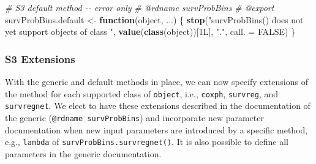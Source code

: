 \documentclass[
]{book}
\newenvironment{Shaded}{\begin{snugshade}}{\end{snugshade}}
\newcommand{\AttributeTok}[1]{\textcolor[rgb]{0.13,0.29,0.53}{#1}}
\newcommand{\CommentTok}[1]{\textcolor[rgb]{0.56,0.35,0.01}{\textit{#1}}}
\newcommand{\ConstantTok}[1]{\textcolor[rgb]{0.56,0.35,0.01}{#1}}
\newcommand{\ControlFlowTok}[1]{\textcolor[rgb]{0.13,0.29,0.53}{\textbf{#1}}}
\newcommand{\FunctionTok}[1]{\textcolor[rgb]{0.13,0.29,0.53}{\textbf{#1}}}
\newcommand{\NormalTok}[1]{#1}
\newcommand{\OtherTok}[1]{\textcolor[rgb]{0.56,0.35,0.01}{#1}}
\newcommand{\StringTok}[1]{\textcolor[rgb]{0.31,0.60,0.02}{#1}}
\begin{document}
\begin{Shaded}
\begin{Highlighting}[]
\CommentTok{\#\textquotesingle{} S3 default method {-}{-} error only}
\CommentTok{\#\textquotesingle{} @rdname survProbBins}
\CommentTok{\#\textquotesingle{} @export}
\NormalTok{survProbBins.default }\OtherTok{\textless{}{-}} \ControlFlowTok{function}\NormalTok{(object, ...) \{}
  \FunctionTok{stop}\NormalTok{(}\StringTok{"\textasciigrave{}survProbBins()\textasciigrave{} does not yet support objects of class "}\NormalTok{,}
       \FunctionTok{value}\NormalTok{(}\FunctionTok{class}\NormalTok{(object))[1L], }\StringTok{"."}\NormalTok{, }\AttributeTok{call. =} \ConstantTok{FALSE}\NormalTok{)}
\NormalTok{\}}
\end{Highlighting}
\end{Shaded}

\hypertarget{s3-extensions}{%
\subsubsection{S3 Extensions}\label{s3-extensions}}

With the generic and default methods in place, we can now specify extensions of the method for each supported class of \texttt{object}, i.e., \texttt{coxph}, \texttt{survreg}, and \texttt{survregnet}. We elect to have these extensions described in the documentation of the generic (\texttt{@rdname\ survProbBins}) and incorporate new parameter documentation when new input parameters are introduced by a specific method, e.g., \texttt{lambda} of \texttt{survProbBins.survregnet()}. It is also possible to define all parameters in the generic documentation.
\end{document}
